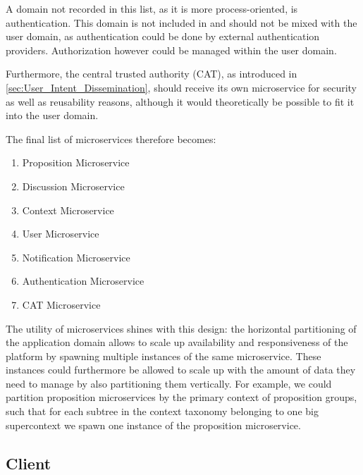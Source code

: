 A domain not recorded in this list, as it is more process-oriented, is authentication.
This domain is not included in and should not be mixed with the user domain, as authentication could be done by external authentication providers.
Authorization however could be managed within the user domain.

Furthermore, the central trusted authority (CAT), as introduced in \autoref{sec:User_Intent_Dissemination}, should receive its own microservice for security as well as reusability reasons, although it would theoretically be possible to fit it into the user domain.

The final list of microservices therefore becomes:
\begin{enumerate}
  \item Proposition Microservice
  \item Discussion Microservice
  \item Context Microservice
  \item User Microservice
  \item Notification Microservice
  \item Authentication Microservice
  \item CAT Microservice
\end{enumerate}

The utility of microservices shines with this design: the horizontal partitioning of the application domain allows to scale up availability and responsiveness of the platform by spawning multiple instances of the same microservice.
These instances could furthermore be allowed to scale up with the amount of data they need to manage by also partitioning them vertically.
For example, we could partition proposition microservices by the primary context of proposition groups, such that for each subtree in the context taxonomy belonging to one big supercontext we spawn one instance of the proposition microservice.

\subsection{Client }
\label{sec:ApplicationDesign}



